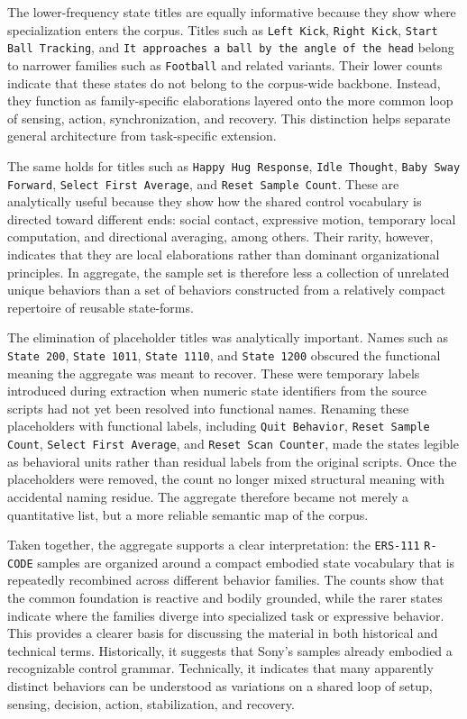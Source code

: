 \documentclass[11pt]{article}
\begin{document}
The lower-frequency state titles are equally informative because they
show where specialization enters the corpus. Titles such as
\texttt{Left Kick}, \texttt{Right Kick}, \texttt{Start Ball Tracking},
and \texttt{It approaches a ball by the angle of the head} belong to
narrower families such as \texttt{Football} and related variants. Their
lower counts indicate that these states do not belong to the
corpus-wide backbone. Instead, they function as family-specific
elaborations layered onto the more common loop of sensing, action,
synchronization, and recovery. This distinction helps separate general
architecture from task-specific extension.

The same holds for titles such as \texttt{Happy Hug Response},
\texttt{Idle Thought}, \texttt{Baby Sway Forward},
\texttt{Select First Average}, and \texttt{Reset Sample Count}. These
are analytically useful because they show how the shared control
vocabulary is directed toward different ends: social contact,
expressive motion, temporary local computation, and directional
averaging, among others. Their rarity, however, indicates that they are
local elaborations rather than dominant organizational principles. In
aggregate, the sample set is therefore less a collection of unrelated
unique behaviors than a set of behaviors constructed from a relatively
compact repertoire of reusable state-forms.

The elimination of placeholder titles was analytically important.
Names such as \texttt{State 200}, \texttt{State 1011},
\texttt{State 1110}, and \texttt{State 1200} obscured the functional
meaning the aggregate was meant to recover. These were temporary labels
introduced during extraction when numeric state identifiers from the
source scripts had not yet been resolved into functional names.
Renaming these placeholders with functional labels, including
\texttt{Quit Behavior}, \texttt{Reset Sample Count},
\texttt{Select First Average}, and \texttt{Reset Scan Counter},
made the states legible as behavioral units rather than residual
labels from the original scripts. Once the placeholders were removed,
the count no longer mixed structural meaning with accidental naming
residue. The aggregate therefore became not merely a quantitative
list, but a more reliable semantic map of the corpus.

Taken together, the aggregate supports a clear interpretation: the
\texttt{ERS-111} \texttt{R-CODE} samples are organized around a compact
embodied state vocabulary that is repeatedly recombined across
different behavior families. The counts show that the common
foundation is reactive and bodily grounded, while the rarer states
indicate where the families diverge into specialized task or expressive
behavior. This provides a clearer basis for discussing the material in
both historical and technical terms. Historically, it suggests that
Sony's samples already embodied a recognizable control grammar.
Technically, it indicates that many apparently distinct behaviors can
be understood as variations on a shared loop of setup, sensing,
decision, action, stabilization, and recovery.
\end{document}
